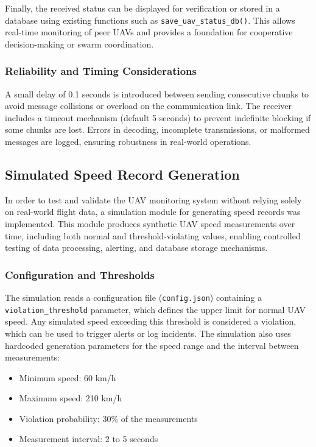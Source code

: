 Finally, the received status can be displayed for verification or stored in a database using existing functions such as \texttt{save\_uav\_status\_db()}. This allows real-time monitoring of peer UAVs and provides a foundation for cooperative decision-making or swarm coordination.

\subsubsection{Reliability and Timing Considerations}

A small delay of 0.1 seconds is introduced between sending consecutive chunks to avoid message collisions or overload on the communication link. The receiver includes a timeout mechanism (default 5 seconds) to prevent indefinite blocking if some chunks are lost. Errors in decoding, incomplete transmissions, or malformed messages are logged, ensuring robustness in real-world operations.



\subsection{Simulated Speed Record Generation}

In order to test and validate the UAV monitoring system without relying solely on real-world flight data, a simulation module for generating speed records was implemented. This module produces synthetic UAV speed measurements over time, including both normal and threshold-violating values, enabling controlled testing of data processing, alerting, and database storage mechanisms.

\subsubsection{Configuration and Thresholds}

The simulation reads a configuration file (\texttt{config.json}) containing a \texttt{violation\_threshold} parameter, which defines the upper limit for normal UAV speed. Any simulated speed exceeding this threshold is considered a violation, which can be used to trigger alerts or log incidents. The simulation also uses hardcoded generation parameters for the speed range and the interval between measurements:

\begin{itemize}
    \item Minimum speed: 60 km/h
    \item Maximum speed: 210 km/h
    \item Violation probability: 30\% of the measurements
    \item Measurement interval: 2 to 5 seconds
\end{itemize}

